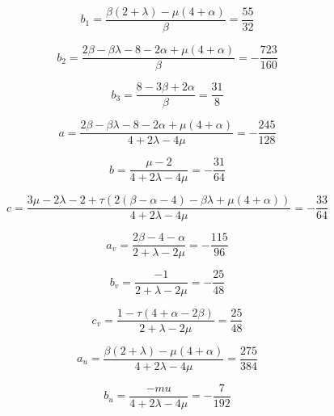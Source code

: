 \documentclass[11pt]{article}
\begin{document}
\begin{equation}
b_1 = \frac{\beta(2 + \lambda) - \mu(4 + \alpha)}{\beta} = \frac{55}{32}
\end{equation}

\begin{equation}
b_2 = \frac{2\beta - \beta\lambda - 8 - 2\alpha + \mu(4 + \alpha)}{\beta} = -\frac{723}{160}
\end{equation}

\begin{equation}
b_3 = \frac{8 - 3\beta + 2\alpha}{\beta} = \frac{31}{8}
\end{equation}

\begin{equation}
a = \frac{2\beta - \beta\lambda - 8 - 2\alpha + \mu(4+\alpha)}{4 + 2\lambda - 4\mu} = -\frac{245}{128}
\end{equation}

\begin{equation}
b = \frac{\mu - 2}{4 + 2\lambda - 4\mu} = -\frac{31}{64}
\end{equation}

\begin{equation}
c = \frac{3\mu - 2\lambda - 2 + \tau\left(2(\beta - \alpha - 4) - \beta\lambda + \mu(4+\alpha)\right)}{4 + 2\lambda - 4\mu} = -\frac{33}{64}
\end{equation}

\begin{equation}
a_v = \frac{2\beta - 4 - \alpha}{2 + \lambda - 2\mu} = -\frac{115}{96}
\end{equation}

\begin{equation}
b_v = \frac{-1}{2 + \lambda - 2\mu} = -\frac{25}{48}
\end{equation}

\begin{equation}
c_v = \frac{1 - \tau(4 + \alpha - 2\beta)}{2 + \lambda - 2\mu} = \frac{25}{48}
\end{equation}

\begin{equation}
a_u = \frac{\beta(2 + \lambda) - \mu(4 + \alpha)}{4 + 2\lambda - 4\mu} = \frac{275}{384}
\end{equation}

\begin{equation}
b_u = \frac{-mu}{4 + 2\lambda - 4\mu} = -\frac{7}{192}
\end{equation}
\end{document}
